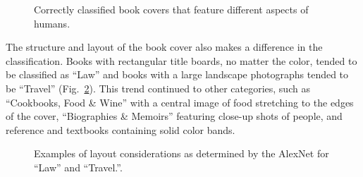 \documentclass[conference]{IEEEtran}
\begin{document}
\begin{figure}
\begin{center}
\framebox[0.02\columnwidth]{ }
\framebox[0.02\columnwidth]{ }
\end{center}
\caption{\label{people} Correctly classified book covers that feature different aspects of humans.}
\end{figure}

The structure and layout of the book cover also makes a difference in the classification.
Books with rectangular title boards, no matter the color, tended to be classified as ``Law'' and books with a large landscape photographs tended to be ``Travel'' (Fig.~\ref{layout}).
This trend continued to other categories, such as ``Cookbooks, Food \& Wine'' with a central image of food stretching to the edges of the cover, ``Biographies \& Memoirs'' featuring close-up shots of people, and reference and textbooks containing solid color bands.

\begin{figure}
\small
\begin{center}
\setlength\fboxsep{0pt}
\setlength\fboxrule{0pt}
\framebox[0.02\columnwidth]{ }

\framebox[0.02\columnwidth]{ }
\framebox[0.02\columnwidth]{ }
\end{center}
\caption{\label{layout} Examples of layout considerations as determined by the AlexNet for ``Law'' and ``Travel.''.}
\end{figure}
\end{document}
